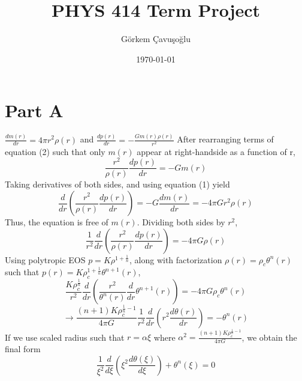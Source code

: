 \documentclass[aps,twocolumn,showpacs,preprintnumbers,nofootinbib,prl,superscriptaddress,groupedaddress]{revtex4-2}
\begin{document}
\title{PHYS 414 Term Project}
\author{G\"{o}rkem \c{C}avu\c{s}o\u{g}lu} %
\date{\today}

\begin{abstract}
\end{abstract}
\maketitle


\section{Part A}



$\frac{d m(r)}{dr}= 4\pi r^2 \rho(r)$   and $\frac{dp(r)}{dr} = -\frac{Gm(r)\rho(r)}{r^2}$
After rearranging terms of equation (2) such that only $m(r)$ appear at right-handside as a function of r,
$$\frac{r^2}{\rho(r)}\frac{dp(r)}{dr} = -Gm(r)$$
Taking derivatives of both sides, and using equation (1) yield
$$\frac{d}{dr}(\frac{r^2}{\rho(r)}\frac{dp(r)}{dr}) = -G\frac{dm(r)}{dr}= -4\pi G r^2 \rho(r)$$
Thus, the equation is free of $m(r)$. Dividing both sides by $r^2$,
$$\frac{1}{r^2}\frac{d}{dr}(\frac{r^2}{\rho(r)}\frac{dp(r)}{dr}) = -4\pi G  \rho(r)$$
Using polytropic EOS $p = K\rho^{1+\frac{1}{n}}$, along with factorization $\rho(r) = \rho_c\theta^n(r)$ such that $p(r) = K\rho_c^{1+\frac{1}{n}}\theta^{n+1}(r)$,
$$\frac{K\rho_c^{\frac{1}{n}}}{r^2}\frac{d}{dr}(\frac{r^2}{\theta^n(r)}\frac{d}{dr}\theta^{n+1}(r)) = -4\pi G  \rho_c\theta^n(r)$$
$$\to \frac{(n+1)K\rho_c^{\frac{1}{n}-1}}{4\pi G  }\frac{1}{r^2}\frac{d}{dr}(r^2\frac{d\theta(r)}{dr}) = -\theta^n(r)$$
If we use scaled radius such that $r = \alpha \xi$  where $\alpha^2 = \frac{(n+1)K\rho_c^{\frac{1}{n}-1}}{4\pi G  }$, we obtain the final form
$$\frac{1}{\xi^2}\frac{d}{d\xi}(\xi^2\frac{d\theta(\xi)}{d\xi}) + \theta^n(\xi) = 0$$
\end{document}
